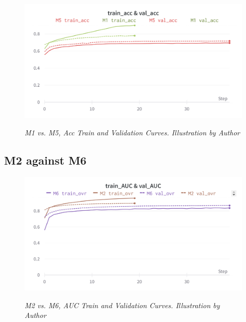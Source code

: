 \begin{figure}[H]
\centering
    \includegraphics[width=\textwidth]{imatges/results/AccM1M5.png}
\caption[M1 vs. M5, Acc Train and Validation Curves]{\textit{M1 vs. M5, Acc Train and Validation Curves. Illustration by Author}}
{\label{fig:accm0m4}}
\end{figure}


\subsection{M2 against M6}

\begin{figure}[H]
\centering
    \includegraphics[width=\textwidth]{imatges/results/AUCM2M6.png}
\caption[M2 vs. M6, AUC Train and Validation Curves]{\textit{M2 vs. M6, AUC Train and Validation Curves. Illustration by Author}}
{\label{fig:aucm0m4}}
\end{figure}

\newpage

